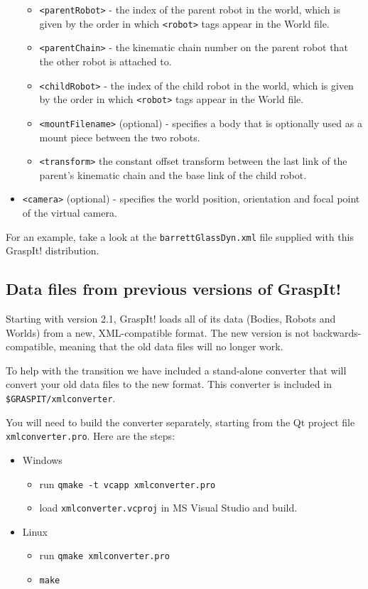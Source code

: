\begin{itemize}
\begin{itemize}
  \item \texttt{<parentRobot>} - the index of the parent robot in the world,
    which is given by the order in which \texttt{<robot>} tags appear in the
    World file. 
  \item \texttt{<parentChain>} - the kinematic chain number on the parent robot
    that the other robot is attached to.
  \item \texttt{<childRobot>} - the index of the child robot in the world,
    which is given by the order in which \texttt{<robot>} tags appear in the
    World file.
  \item \texttt{<mountFilename>} (optional) - specifies a body that is
    optionally used as a mount piece between the two robots.
  \item \texttt{<transform>} the constant offset transform between the last
    link of the parent's kinematic chain and the base link of the
    child robot.
  \end{itemize}
\item \texttt{<camera>} (optional) - specifies the world position, orientation
  and focal point of the virtual camera.
\end{itemize}

For an example, take a look at the \texttt{barrettGlassDyn.xml} file
supplied with this GraspIt! distribution.

\subsection{Data files from previous versions of GraspIt!}

Starting with version 2.1, GraspIt! loads all of its data (Bodies,
Robots and Worlds) from a new, XML-compatible format. The new version
is not backwards-compatible, meaning that the old data files will no
longer work.

To help with the transition we have included a stand-alone converter
that will convert your old data files to the new format. This
converter is included in \texttt{\$GRASPIT/xmlconverter}.

You will need to build the converter separately, starting from the Qt
project file \texttt{xmlconverter.pro}. Here are the steps:
\begin{itemize}
\item Windows
  \begin{itemize}
    \item run \texttt{qmake -t vcapp xmlconverter.pro}
    \item load \texttt{xmlconverter.vcproj} in MS Visual Studio and build.
  \end{itemize}
\item Linux
  \begin{itemize}
    \item run \texttt{qmake xmlconverter.pro}
    \item \texttt{make}
  \end{itemize}
\end{itemize}

